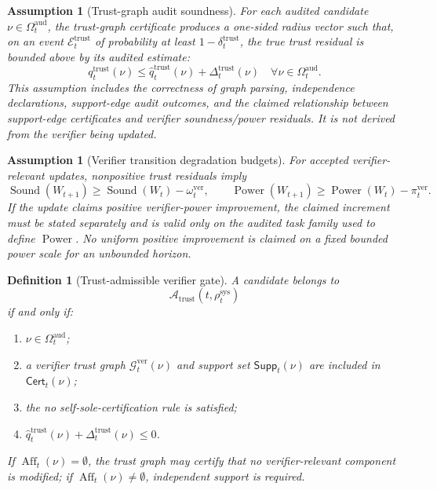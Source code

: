 \documentclass[11pt,a4paper]{article}
\newtheorem{definition}[theorem]{Definition}
\newtheorem{assumption}[theorem]{Assumption}
\newcommand{\Acal}{\mathcal A}
\newcommand{\Ecal}{\mathcal E}
\newcommand{\Gcal}{\mathcal G}
\newcommand{\sys}{\mathrm{sys}}
\newcommand{\aud}{\mathrm{aud}}
\newcommand{\Sound}{\operatorname{Sound}}
\newcommand{\Power}{\operatorname{Power}}
\newcommand{\ver}{\mathrm{ver}}
\newcommand{\trust}{\mathrm{trust}}
\begin{document}
\begin{assumption}[Trust-graph audit soundness]
\label{ass:trust-graph-audit-soundness}
For each audited candidate \(\nu\in\Omega_t^{\aud}\), the trust-graph certificate produces a one-sided radius vector such that, on an event \(\Ecal_t^{\trust}\) of probability at least \(1-\delta_t^{\trust}\), the true trust residual is bounded above by its audited estimate:
\[
q_t^{\trust}(\nu)
\le
\widehat q_t^{\trust}(\nu)+\Delta_t^{\trust}(\nu)
\quad
\forall \nu\in\Omega_t^{\aud}.
\]
This assumption includes the correctness of graph parsing, independence declarations, support-edge audit outcomes, and the claimed relationship between support-edge certificates and verifier soundness/power residuals.  It is not derived from the verifier being updated.
\end{assumption}

\begin{assumption}[Verifier transition degradation budgets]
\label{ass:verifier-transition-budgets}
For accepted verifier-relevant updates, nonpositive trust residuals imply
\[
\Sound(W_{t+1})\ge \Sound(W_t)-\omega_t^{\ver},
\qquad
\Power(W_{t+1})\ge \Power(W_t)-\pi_t^{\ver}.
\]
If the update claims positive verifier-power improvement, the claimed increment must be stated separately and is valid only on the audited task family used to define \(\Power\).  No uniform positive improvement is claimed on a fixed bounded power scale for an unbounded horizon.
\end{assumption}

\begin{definition}[Trust-admissible verifier gate]
\label{def:trust-admissible-verifier-gate}
A candidate belongs to
\[
\Acal_{\trust}(t,\rho_t^{\sys})
\]
if and only if:
\begin{enumerate}[label=(\roman*),leftmargin=1.5em]
    \item \(\nu\in\Omega_t^{\aud}\);
    \item a verifier trust graph \(\Gcal_t^{\ver}(\nu)\) and support set \(\mathsf{Supp}_t(\nu)\) are included in \(\mathsf{Cert}_t(\nu)\);
    \item the no self-sole-certification rule is satisfied;
    \item \(\widehat q_t^{\trust}(\nu)+\Delta_t^{\trust}(\nu)
    \le0\).
\end{enumerate}
If \(\operatorname{Aff}_t(\nu)=\emptyset\), the trust graph may certify that no verifier-relevant component is modified; if \(\operatorname{Aff}_t(\nu)\neq\emptyset\), independent support is required.
\end{definition}
\end{document}
